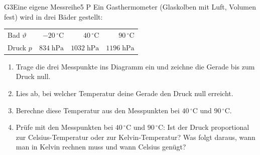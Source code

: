 \documentclass[11pt]{article}
\begin{document}
\begin{lpaufgabe}{G3}{Eine eigene Messreihe}{5 P}
Ein Gasthermometer (Glaskolben mit Luft, Volumen fest) wird in drei Bäder gestellt:\par\smallskip
\begin{center}\begin{tabular}{lrrr}\toprule
Bad $\vartheta$ & $-20\,^\circ\text{C}$ & $40\,^\circ\text{C}$ & $90\,^\circ\text{C}$\\
Druck $p$ & $834\;\text{hPa}$ & $1032\;\text{hPa}$ & $1196\;\text{hPa}$\\\bottomrule
\end{tabular}\end{center}
\begin{center}\end{center}
\begin{enumerate}[label=\alph*),leftmargin=*,itemsep=2pt,topsep=2pt]
\item Trage die drei Messpunkte ins Diagramm ein und zeichne die Gerade bis zum Druck null.
\item Lies ab, bei welcher Temperatur deine Gerade den Druck null erreicht.
\item Berechne diese Temperatur aus den Messpunkten bei $40\,^\circ\text{C}$ und $90\,^\circ\text{C}$.
\item Prüfe mit den Messpunkten bei $40\,^\circ\text{C}$ und $90\,^\circ\text{C}$: Ist der Druck proportional zur Celsius-Temperatur oder zur Kelvin-Temperatur? Was folgt daraus, wann man in Kelvin rechnen muss und wann Celsius genügt?
\end{enumerate}
\end{lpaufgabe}
\end{document}
